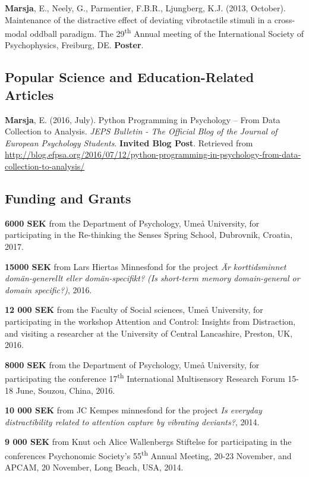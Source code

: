 \documentclass[]{article}
\begin{document}
\textbf{Marsja}, E., Neely, G., Parmentier, F.B.R., Ljungberg, K.J.
(2013, October). Maintenance of the distractive effect of deviating
vibrotactile stimuli in a cross-modal oddball paradigm. The
29\textsuperscript{th} Annual meeting of the International Society of
Psychophysics, Freiburg, DE. \textbf{Poster}.

\hypertarget{popular-science-and-education-related-articles}{%
\subsection{Popular Science and Education-Related
Articles}\label{popular-science-and-education-related-articles}}

\textbf{Marsja}, E. (2016, July). Python Programming in Psychology --
From Data Collection to Analysis. \emph{JEPS Bulletin - The Official
Blog of the Journal of European Psychology Students}. \textbf{Invited
Blog Post}. Retrieved from \sloppy
\url{http://blog.efpsa.org/2016/07/12/python-programming-in-psychology-from-data-collection-to-analysis/}

\hypertarget{funding-and-grants}{%
\subsection{Funding and Grants}\label{funding-and-grants}}

\textbf{6000 SEK} from the Department of Psychology, Umeå University,
for participating in the Re-thinking the Senses Spring School,
Dubrovnik, Croatia, 2017.

\textbf{15000 SEK} from Lars Hiertas Minnesfond for the project \emph{Är
korttidsminnet domän-generellt eller domän-specifikt? (Is short-term
memory domain-general or domain specific?)}, 2016.

\textbf{12 000 SEK} from the Faculty of Social sciences, Umeå
University, for participating in the workshop Attention and Control:
Insights from Distraction, and visiting a researcher at the University
of Central Lancashire, Preston, UK, 2016.

\textbf{8000 SEK} from the Department of Psychology, Umeå University,
for participating the conference 17\textsuperscript{th} International
Multisensory Research Forum 15-18 June, Souzou, China, 2016.

\textbf{10 000 SEK} from JC Kempes minnesfond for the project \emph{Is
everyday distractibility related to attention capture by vibrating
deviants?}, 2014.

\textbf{9 000 SEK} from Knut och Alice Wallenbergs Stiftelse for
participating in the conferences Psychonomic Society's
55\textsuperscript{th} Annual Meeting, 20-23 November, and APCAM, 20
November, Long Beach, USA, 2014.
\end{document}
